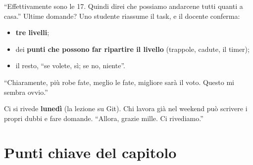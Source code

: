 ``Effettivamente sono le 17. Quindi direi che possiamo andarcene tutti quanti a
casa.'' Ultime domande? Uno studente riassume il task, e il docente conferma:
\begin{itemize}
  \item \textbf{tre livelli};
  \item dei \textbf{punti che possono far ripartire il livello} (trappole,
        cadute, il timer);
  \item il resto, ``se volete, sì; se no, niente''.
\end{itemize}
``Chiaramente, più robe fate, meglio le fate, migliore sarà il voto. Questo mi
sembra ovvio.''

Ci si rivede \textbf{lunedì} (la lezione su Git). Chi lavora già nel weekend può
scrivere i propri dubbi e fare domande. ``Allora, grazie mille. Ci
rivediamo.''

\section*{Punti chiave del capitolo}

